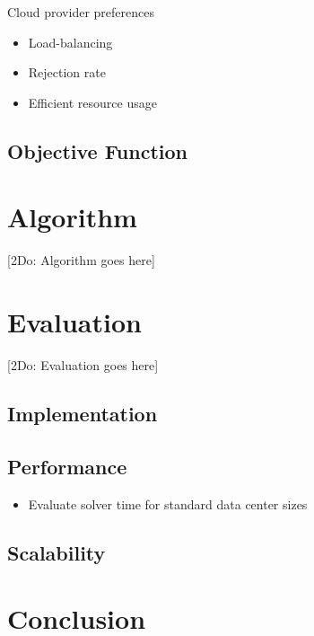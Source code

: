 \documentclass[conference]{IEEEtran}
\begin{document}
Cloud provider preferences
\begin{itemize}
	\item Load-balancing
	\item Rejection rate
	\item Efficient resource usage
\end{itemize}

\subsection{Objective Function}

\section{Algorithm}

[2Do: Algorithm goes here]

\section{Evaluation}

[2Do: Evaluation goes here]
\subsection{Implementation}

\subsection{Performance}

\begin{itemize}
	\item Evaluate solver time for standard data center sizes
\end{itemize}

\subsection{Scalability}

\section{Conclusion}




\end{document}
